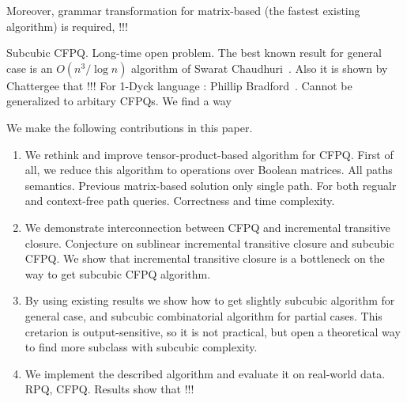 Moreover, grammar transformation for matrix-based (the fastest existing algorithm) is required, !!!

Subcubic CFPQ. Long-time open problem. 
The best known result for general case is an $O(n^3/\log{n})$ algorithm of Swarat Chaudhuri~\cite{10.1145/1328438.1328460}.
Also it is shown by Chattergee that !!!
For 1-Dyck language : Phillip Bradford~\cite{8249039}. Cannot be generalized to arbitary CFPQs. 
We find a way

We make the following contributions in this paper.
\begin{enumerate}
	\item We rethink and improve tensor-product-based algorithm for CFPQ. First of all, we reduce this algorithm to operations over Boolean matrices. All paths semantics. Previous matrix-based solution only single path. For both regualr and context-free path queries. Correctness and time complexity.
	\item We demonstrate interconnection between CFPQ and incremental transitive closure. Conjecture on sublinear incremental transitive closure and subcubic CFPQ. We show that incremental transitive closure is a bottleneck on the way to get subcubic CFPQ algorithm.
	\item By using existing results we show how to get slightly subcubic algorithm for general case, and subcubic combinatorial algorithm for partial cases. This cretarion is output-sensitive, so it is not practical, but open a theoretical way to find more subclass with subcubic complexity.
	\item We implement the described algorithm and evaluate it on real-world data. RPQ, CFPQ. Results show that !!!
\end{enumerate}